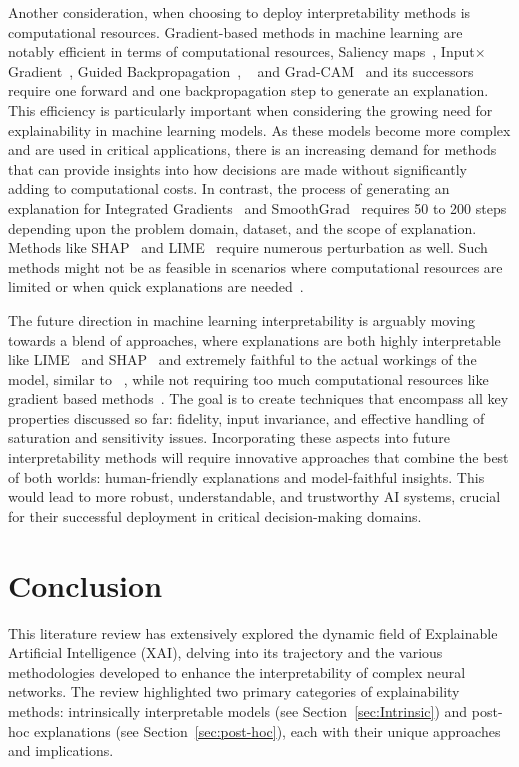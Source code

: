 Another consideration, when choosing to deploy interpretability methods is computational resources. Gradient-based methods in machine learning are notably efficient in terms of computational resources, Saliency maps~\cite{SimonyanVZ13}, Input$\times$Gradient~\cite{SimonyanVZ13}, Guided Backpropagation~\cite{SpringenbergDBR14}, \LRP~\cite{bach2015pixel} and  Grad-CAM~\cite{SelvarajuCDVPB20} and its successors~\cite{SelvarajuCDVPB20, ChattopadhyaySH18, abs-1908-01224, SmilkovTKVW17} require one forward and one backpropagation step to generate an explanation. This efficiency is particularly important when considering the growing need for explainability in machine learning models. As these models become more complex and are used in critical applications, there is an increasing demand for methods that can provide insights into how decisions are made without significantly adding to computational costs. In contrast, the process of generating an explanation for Integrated Gradients~\cite{SundararajanTY17} and SmoothGrad~\cite{SmilkovTKVW17} requires 50 to 200 steps depending upon the problem domain, dataset, and the scope of explanation. Methods like SHAP~\cite{LundbergL17} and LIME~\cite{Ribeiro0G16} require numerous perturbation as well. Such methods might not be as feasible in scenarios where computational resources are limited or when quick explanations are needed~\cite{GhorbaniAZ19}.


The future direction in machine learning interpretability is arguably moving towards a blend of approaches, where explanations are both highly interpretable like LIME~\cite{bach2015pixel} and SHAP~\cite{LundbergL17} and extremely faithful to the actual workings of the model, similar to \LRP~\cite{bach2015pixel}, while not requiring too much computational resources like gradient based methods~\cite{SimonyanVZ13, SimonyanVZ13, SpringenbergDBR14, bach2015pixel, SelvarajuCDVPB20, SelvarajuCDVPB20, ChattopadhyaySH18, abs-1908-01224, SmilkovTKVW17}. The goal is to create techniques that encompass all key properties discussed so far: fidelity, input invariance, and effective handling of saturation and sensitivity issues. Incorporating these aspects into future interpretability methods will require innovative approaches that combine the best of both worlds:  human-friendly explanations and model-faithful insights. This would lead to more robust, understandable, and trustworthy AI systems, crucial for their successful deployment in critical decision-making domains.


\section{Conclusion}
This literature review has extensively explored the dynamic field of Explainable Artificial Intelligence (XAI), delving into its trajectory and the various methodologies developed to enhance the interpretability of complex neural networks. The review highlighted two primary categories of explainability methods: intrinsically interpretable models (see Section~\ref{sec:Intrinsic}) and post-hoc explanations (see Section~\ref{sec:post-hoc}), each with their unique approaches and implications.

